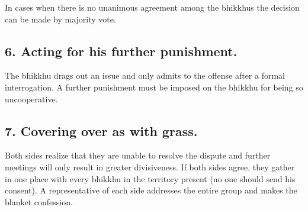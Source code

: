 In cases when there is no unanimous agreement among the bhikkhus the
decision can be made by majority vote.

\subsection{6. Acting for his further punishment.}

The bhikkhu drags out an issue and only admits to the offense after a
formal interrogation. A further punishment must be imposed on the
bhikkhu for being so uncooperative.

\subsection{7. Covering over as with grass.}

Both sides realize that they are unable to resolve the dispute and
further meetings will only result in greater divisiveness. If both sides
agree, they gather in one place with every bhikkhu in the territory
present (no one should send his consent). A representative of each side
addresses the entire group and makes the blanket confession.

